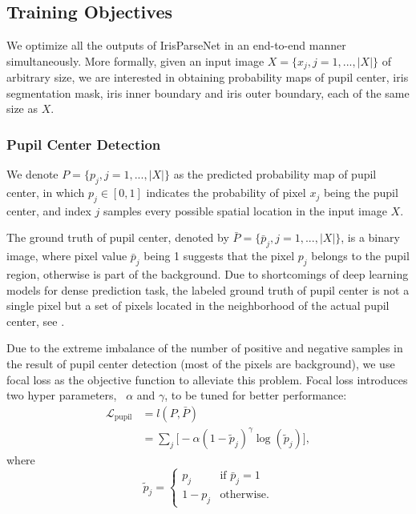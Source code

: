 \documentclass[journal]{IEEEtran}
\begin{document}
\subsection{Training Objectives}
We optimize all the outputs of IrisParseNet in an end-to-end manner simultaneously. More formally, given an input image $X = \{x_j, j=1,...,|X|\}$ of arbitrary size, we are interested in obtaining probability maps of pupil center, iris segmentation mask, iris inner boundary and iris outer boundary, each of the same size as $X$.

\subsubsection{Pupil Center Detection}
We denote $P = \{p_{j}, j=1,...,|X|\}$ as the predicted probability map of pupil center, in which $p_{j}\in[0,1]$ indicates the probability of pixel $x_j$ being the pupil center, and index $j$ samples every possible spatial location in the input image $X$.

The ground truth of pupil center, denoted by $\bar{P} = \{\bar{p}_{j}, j=1,...,|X|\}$, is a binary image, where pixel value $\bar{p}_{j}$ being 1 suggests that the pixel ${p}_{j}$ belongs to the pupil region, otherwise is part of the background. Due to shortcomings of deep learning models for dense prediction task, the labeled ground truth of pupil center is not a single pixel but a set of pixels located in the neighborhood of the actual pupil center, see .

Due to the extreme imbalance of the number of positive and negative samples in the result of pupil center detection (most of the pixels are background), we use focal loss\cite{lin2017focal} as the objective function to alleviate this problem. Focal loss introduces two hyper parameters, \ie~$\alpha$ and $\gamma$, to be tuned for better performance:
\begin{equation}
\begin{split}
\mathcal{L}_{\text{pupil}} &= l(P,\bar{P})\\
  &=\sum_{j}\Big[-\alpha(1-\tilde{p}_{j})^{\gamma}\log(\tilde{p}_{j})\Big],
\end{split}
\label{eq:pupil_loss}
\end{equation}
 where
\begin{equation}
  \tilde{p}_{j} =
  \begin{cases}
    p_{j} &\text{if $\bar{p}_{j}=1$}\\
    1-p_{j} &\text{otherwise}.
  \end{cases}
  \label{eq:quant}
\end{equation}
\end{document}
